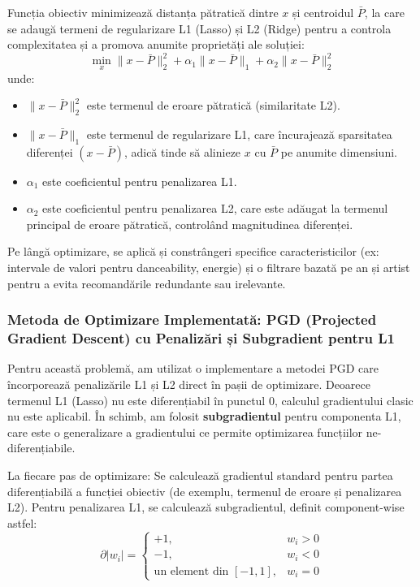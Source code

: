 \documentclass[12pt,a4paper]{article}
\begin{document}
	Funcția obiectiv minimizează distanța pătratică dintre $x$ și centroidul $\bar{P}$, la care se adaugă termeni de regularizare L1 (Lasso) și L2 (Ridge) pentru a controla complexitatea și a promova anumite proprietăți ale soluției:
	\begin{equation}
		\min_{x} \| x - \bar{P} \|_2^2 + \alpha_1 \| x - \bar{P} \|_1 + \alpha_2 \| x - \bar{P} \|_2^2
	\end{equation}
	unde:
	\begin{itemize}
		\item $\| x - \bar{P} \|_2^2$ este termenul de eroare pătratică (similaritate L2).
		\item $\| x - \bar{P} \|_1$ este termenul de regularizare L1, care încurajează sparsitatea diferenței $(x - \bar{P})$, adică tinde să alinieze $x$ cu $\bar{P}$ pe anumite dimensiuni.
		\item $\alpha_1$ este coeficientul pentru penalizarea L1.
		\item $\alpha_2$ este coeficientul pentru penalizarea L2, care este adăugat la termenul principal de eroare pătratică, controlând magnitudinea diferenței.
	\end{itemize}
	Pe lângă optimizare, se aplică și constrângeri specifice caracteristicilor (ex: intervale de valori pentru danceability, energie) și o filtrare bazată pe an și artist pentru a evita recomandările redundante sau irelevante.

\subsubsection{Metoda de Optimizare Implementată: PGD (Projected Gradient Descent) cu Penalizări și Subgradient pentru L1}  
Pentru această problemă, am utilizat o implementare a metodei PGD care încorporează penalizările L1 și L2 direct în pașii de optimizare. Deoarece termenul L1 (Lasso) nu este diferențiabil în punctul 0, calculul gradientului clasic nu este aplicabil. În schimb, am folosit \textbf{subgradientul} pentru componenta L1, care este o generalizare a gradientului ce permite optimizarea funcțiilor ne-diferențiabile.  

La fiecare pas de optimizare:  
    Se calculează gradientul standard pentru partea diferențiabilă a funcției obiectiv (de exemplu, termenul de eroare și penalizarea L2).  
    Pentru penalizarea L1, se calculează subgradientul, definit component-wise astfel:  
\[
\partial |w_i| = 
\begin{cases}
+1, & w_i > 0 \\
-1, & w_i < 0 \\
\text{un element din } [-1, 1], & w_i = 0
\end{cases}
\]
\end{document}
